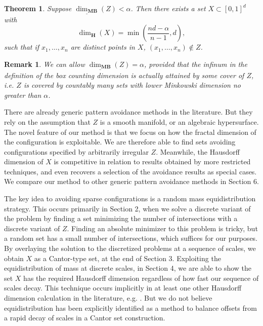 \documentclass[usenames,dvipsnames]{article}
\theoremstyle{plain}
\theoremstyle{plain}
\newtheorem{theorem}{Theorem}
\newtheorem*{remark}{Remark}
\begin{document}

\begin{theorem}
	Suppose $\underline{\dim_{\mathbf{MB}}}(Z) < \alpha$. Then there exists a set $X \subset [0,1]^d$ with
	\[ \dim_{\mathbf{H}}(X) = \min \left( \frac{nd - \alpha}{n-1}, d \right), \]
	such that if $x_1, \dots, x_n$ are distinct points in $X$, $(x_1, \dots, x_n) \not \in Z$.
\end{theorem}

\begin{remark}
	We can allow $\underline{\dim_{\mathbf{MB}}}(Z) = \alpha$, provided that the infinum in the definition of the box counting dimension is actually attained by some cover of $Z$, i.e. $Z$ is covered by countably many sets with lower Minkowski dimension no greater than $\alpha$.
\end{remark}

There are already generic pattern avoidance methods in the literature. But they rely on the assumption that $Z$ is a smooth manifold, or an algebraic hypersurface. The novel feature of our method is that we focus on how the fractal dimension of the configuration is exploitable. We are therefore able to find sets avoiding configurations specified by arbitrarily irregular $Z$. Meanwhile, the Hausdorff dimension of $X$ is competitive in relation to results obtained by more restricted techniques, and even recovers a selection of the avoidance results as special cases. We compare our method to other generic pattern avoidance methods in Section 6.

The key idea to avoiding sparse configurations is a random mass equidistribution strategy. This occurs primarily in Section 2, when we solve a discrete variant of the problem by finding a set minimizing the number of intersections with a discrete variant of $Z$. Finding an absolute minimizer to this problem is tricky, but a random set has a small number of intersections, which suffices for our purposes. By overlaying the solution to the discretized problems at a sequence of scales, we obtain $X$ as a Cantor-type set, at the end of Section 3. Exploiting the equidistribution of mass at discrete scales, in Section 4, we are able to show the set $X$ has the required Hausdorff dimension regardless of how fast our sequence of scales decay. This technique occurs implicitly in at least one other Hausdorff dimension calculation in the literature, e.g. \cite{MalabikaRob}. But we do not believe equidistribution has been explicitly identified as a method to balance offsets from a rapid decay of scales in a Cantor set construction.
\end{document}
